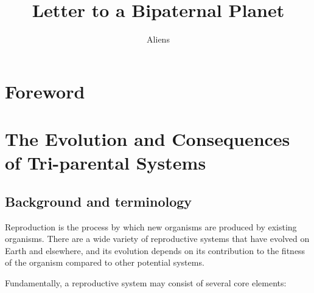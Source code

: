 \documentclass{report}
\begin{document}
\title{Letter to a Bipaternal Planet}
\author{Aliens}




\maketitle
\chapter*{Foreword}


\chapter*{The Evolution and Consequences of Tri-parental Systems}

\section*{Background and terminology}


Reproduction is the process by which new organisms are produced by existing organisms. There are a wide variety of reproductive systems that have evolved on Earth and elsewhere, and its evolution depends on its contribution to the fitness of the organism compared to other potential systems. 

Fundamentally, a reproductive system may consist of several core elements:
\end{document}
